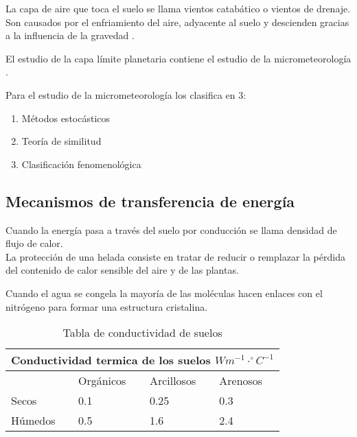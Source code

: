 \documentclass[11pt]{article}
\begin{document}
La capa de aire que toca el suelo se llama vientos catabático o vientos de drenaje. Son causados por el enfriamiento del aire, adyacente al suelo y descienden gracias a la influencia de la gravedad \citep{Stull1988pbl}.

El estudio de la capa límite planetaria contiene el estudio de la micrometeorología \citep{Stull1988pbl}.

Para el estudio de la micrometeorología \citet{Stull1988pbl} los clasifica en 3:

\begin{enumerate}
\item Métodos estocásticos
\item Teoría de similitud
\item Clasificación fenomenológica
\end{enumerate}




\subsection{Mecanismos de transferencia de energía}

Cuando la energía pasa a través del suelo por conducción se llama densidad de flujo de calor.\\
La protección de una helada consiste en tratar de reducir o remplazar la pérdida del contenido de calor sensible del aire y de las plantas.



Cuando el agua se congela la mayoría de las moléculas hacen enlaces con el nitrógeno para formar una estructura cristalina. 

\begin{table}[H]
\centering

\label{tabla_conductividad}
\begin{tabular}{@{}llll@{}}
\multicolumn{4}{l}{Conductividad termica de los suelos $W m^{-1}\cdot^{\circ}C^{-1} $} \\ \midrule
\multicolumn{1}{l|}{}         & Orgánicos  & Arcillosos & Arenosos \\ \midrule
\multicolumn{1}{l|}{Secos}    & 0.1        & 0.25       & 0.3      \\
\multicolumn{1}{l|}{Húmedos}  & 0.5        & 1.6        & 2.4     

\end{tabular}
\caption{Tabla de conductividad de suelos}
\end{table}
\end{document}
